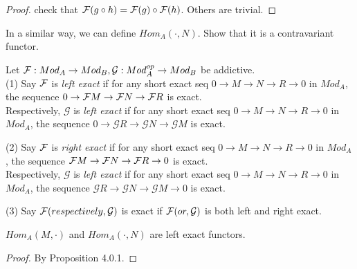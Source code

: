 \documentclass[11pt,fleqn]{book} %
\begin{document}
\begin{CJK}{UTF8}{gkai}
\begin{proof}
	check that $\mathcal{F}(g\circ h) = \mathcal{F}(g)\circ \mathcal{F}(h)$. Others are trivial.
\end{proof}

\begin{example}
	In a similar way, we can define $Hom_A(\cdot,N)$. Show that it is a contravariant functor.
\end{example}

\newcommand{\mcg}{\mathcal{G}}
\begin{definition}
	 Let $\mcf:Mod_A \to Mod_B, \mcg:Mod_A^{op}\to Mod_B$ be addictive. \\
	(1) Say $\mathcal{F}$ is {\it left exact} if for any short exact seq $0\to M\to N\to R \to 0$ in $Mod_A$, the sequence $0\to \mathcal{F} M\to \mathcal{F} N \to \mathcal{F} R$ is exact. \\
		Respectively, $\mcg$ is {\it left exact} if for any short exact seq $0\to M\to N\to R \to 0$ in $Mod_A$, the sequence $0\to \mcg R\to \mcg N \to \mcg M$ is exact.
	
	(2) Say $\mathcal{F}$ is {\it right exact} if for any short exact seq $0\to M\to N\to R \to 0$ in $Mod_A$, the sequence $\mathcal{F} M\to \mathcal{F} N \to \mathcal{F} R\to 0$ is exact. \\
	Respectively, $\mcg$ is {\it left exact} if for any short exact seq $0\to M\to N\to R \to 0$ in $Mod_A$, the sequence $\mcg R\to \mcg N \to \mcg M\to 0$ is exact.

	(3) Say $\mcf (respectively, \mcg)$ is exact if $\mcf (or, \mcg)$ is both left and right exact. 
\end{definition}

\begin{proposition}
	$Hom_A(M,\cdot)$ and $Hom_A(\cdot, N)$ are left exact functors.	
\end{proposition}
\begin{proof}
	By Proposition 4.0.1.
\end{proof}


\end{CJK}
\end{document}
